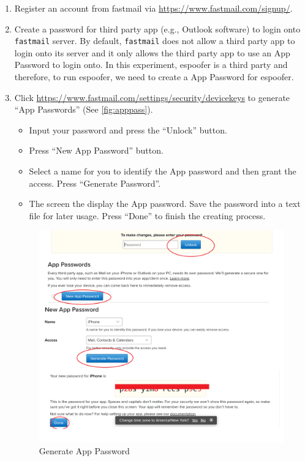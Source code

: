 \documentclass[11pt]{article}
\newcommand{\espoofer}{{\sf espoofer}\xspace}
\begin{document}
\begin{enumerate}
\item Register an account from fastmail via \url{https://www.fastmail.com/signup/}.
\item Create a password for third party app (e.g., Outlook software) to login onto \texttt{fastmail} server. By default, \texttt{fastmail} does not allow a third party app to login onto its server and it only allows the third party app to use an App Password to login onto. In this experiment, \espoofer is a third party and therefore, to run \espoofer, we need to create a App Password for \espoofer.
\item Click \url{https://www.fastmail.com/settings/security/devicekeys} to generate ``App Passwords'' (See \autoref{fig:apppass}).
\begin{itemize}
\item Input your password and press the ``Unlock'' button.
\item Press ``New App Password'' button.
\item Select a name for you to identify the App password and then grant the access. Press ``Generate Password''.
\item   The screen the display the App password. Save the password into a text file for later usage. Press ``Done'' to finish the creating process.
\end{itemize}


\begin{figure}[h]
\centering
\vspace{-2mm}
\includegraphics[width=0.8\columnwidth]{apppass}
\caption{Generate App Password}\label{fig:apppass}
\end{figure}


\end{enumerate}
\end{document}
